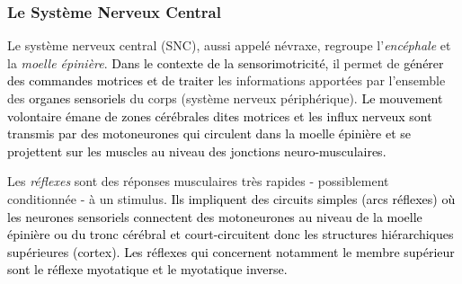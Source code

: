 \subsubsection{Le Système Nerveux Central} \label{chap_1_sec_modelling_human_subsec_1_2}

Le système nerveux central (SNC), aussi appelé névraxe, regroupe l'\emph{encéphale} et la \emph{moelle épinière}. \textcolor{black}{Dans le contexte de la sensorimotricité,} il permet de \textcolor{black}{générer des commandes motrices et de traiter} les informations apportées par l'ensemble des \textcolor{black}{organes sensoriels} du corps (système nerveux périphérique). %
\textcolor{black}{Le mouvement volontaire émane de zones cérébrales dites motrices et les influx nerveux sont transmis par des motoneurones qui circulent dans la moelle épinière et se projettent sur les muscles au niveau des jonctions neuro-musculaires.}

Les \emph{réflexes} sont des réponses musculaires très rapides - possiblement conditionnée \parencite{brogden_cerebellar_1937, pavlov_conditioned_2010} - à un stimulus. %
\textcolor{black}{Ils impliquent des circuits simples (arcs réflexes) où les neurones sensoriels connectent des motoneurones au niveau de la moelle épinière ou du tronc cérébral et court-circuitent donc les structures hiérarchiques supérieures (cortex). Les réflexes qui concernent notamment le membre supérieur sont le réflexe myotatique et le myotatique inverse.}

